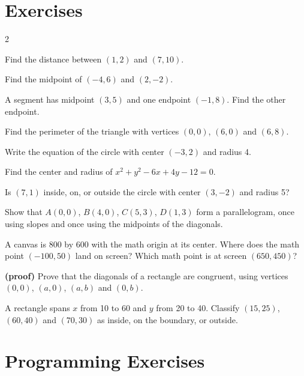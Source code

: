 \section{Exercises}

\begin{multicols}{2}
\begin{exercises}
\item Find the distance between $(1, 2)$ and $(7, 10)$.
\item Find the midpoint of $(-4, 6)$ and $(2, -2)$.
\item A segment has midpoint $(3, 5)$ and one endpoint $(-1, 8)$. Find the other endpoint.
\item Find the perimeter of the triangle with vertices $(0, 0)$, $(6, 0)$ and $(6, 8)$.
\item Write the equation of the circle with center $(-3, 2)$ and radius 4.
\item Find the center and radius of $x^2 + y^2 - 6x + 4y - 12 = 0$.
\item Is $(7, 1)$ inside, on, or outside the circle with center $(3, -2)$ and radius 5?
\item Show that $A(0, 0)$, $B(4, 0)$, $C(5, 3)$, $D(1, 3)$ form a parallelogram, once using slopes and once using the midpoints of the diagonals.
\item A canvas is 800 by 600 with the math origin at its center. Where does the math point $(-100, 50)$ land on screen? Which math point is at screen $(650, 450)$?
\item \textbf{(proof)} Prove that the diagonals of a rectangle are congruent, using vertices $(0, 0)$, $(a, 0)$, $(a, b)$ and $(0, b)$.
\item A rectangle spans $x$ from 10 to 60 and $y$ from 20 to 40. Classify $(15, 25)$, $(60, 40)$ and $(70, 30)$ as inside, on the boundary, or outside.
\end{exercises}
\end{multicols}

\section{Programming Exercises}

